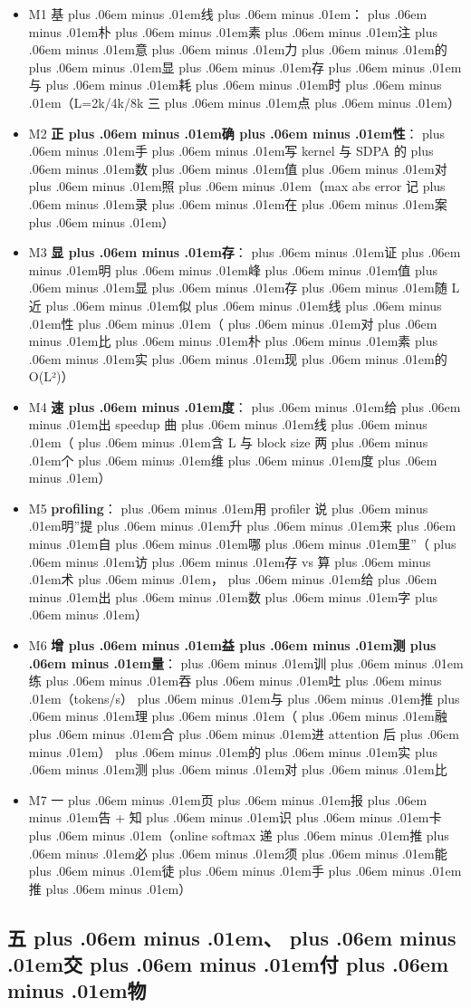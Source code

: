 \documentclass[
]{article}
\providecommand{\tightlist}{%
  \setlength{\itemsep}{0pt}\setlength{\parskip}{0pt}}
\def\zh#1{{\zhfont #1}}
\def\sym#1{{\symfont #1}}
\def\zhglue{\hskip0pt plus .06em minus .01em}
\begin{document}
\begin{itemize}
\tightlist
\item[$\square$]
  M1 \zh{基\zhglue 线\zhglue ：\zhglue 朴\zhglue 素\zhglue 注\zhglue 意\zhglue 力\zhglue 的\zhglue 显\zhglue 存\zhglue 与\zhglue 耗\zhglue 时\zhglue （}L=2k/4k/8k \zh{三\zhglue 点\zhglue ）}
\item[$\square$]
  M2 \textbf{\zh{正\zhglue 确\zhglue 性}}\zh{：\zhglue 手\zhglue 写} kernel \zh{与} SDPA \zh{的\zhglue 数\zhglue 值\zhglue 对\zhglue 照\zhglue （}max abs error \zh{记\zhglue 录\zhglue 在\zhglue 案\zhglue ）}
\item[$\square$]
  M3 \textbf{\zh{显\zhglue 存}}\zh{：\zhglue 证\zhglue 明\zhglue 峰\zhglue 值\zhglue 显\zhglue 存\zhglue 随} L \zh{近\zhglue 似\zhglue 线\zhglue 性\zhglue （\zhglue 对\zhglue 比\zhglue 朴\zhglue 素\zhglue 实\zhglue 现\zhglue 的} O(L\sym{²})\zh{）}
\item[$\square$]
  M4 \textbf{\zh{速\zhglue 度}}\zh{：\zhglue 给\zhglue 出} speedup \zh{曲\zhglue 线\zhglue （\zhglue 含} L \zh{与} block size \zh{两\zhglue 个\zhglue 维\zhglue 度\zhglue ）}
\item[$\square$]
  M5 \textbf{profiling}\zh{：\zhglue 用} profiler \zh{说\zhglue 明}''\zh{提\zhglue 升\zhglue 来\zhglue 自\zhglue 哪\zhglue 里}''\zh{（\zhglue 访\zhglue 存} vs \zh{算\zhglue 术\zhglue ，\zhglue 给\zhglue 出\zhglue 数\zhglue 字\zhglue ）}
\item[$\square$]
  M6 \textbf{\zh{增\zhglue 益\zhglue 测\zhglue 量}}\zh{：\zhglue 训\zhglue 练\zhglue 吞\zhglue 吐\zhglue （}tokens/s\zh{）\zhglue 与\zhglue 推\zhglue 理\zhglue （\zhglue 融\zhglue 合\zhglue 进} attention \zh{后\zhglue ）\zhglue 的\zhglue 实\zhglue 测\zhglue 对\zhglue 比}
\item[$\square$]
  M7 \zh{一\zhglue 页\zhglue 报\zhglue 告} + \zh{知\zhglue 识\zhglue 卡\zhglue （}online softmax \zh{递\zhglue 推\zhglue 必\zhglue 须\zhglue 能\zhglue 徒\zhglue 手\zhglue 推\zhglue ）}
\end{itemize}

\subsection{\zh{五\zhglue 、\zhglue 交\zhglue 付\zhglue 物}}\label{ux4e94ux4ea4ux4ed8ux7269}
\end{document}
